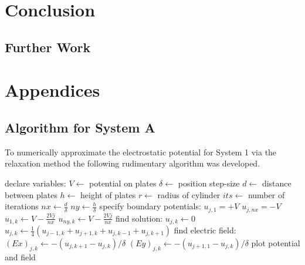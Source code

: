 \documentclass[12pt, a4paper]{article}
\begin{document}
\section{Conclusion}

\subsection{Further Work}



\appendix
\section{Appendices}
\subsection{Algorithm for System A}
To numerically approximate the electrostatic potential for System 1 via the 
relaxation method the following rudimentary algorithm was developed.

\begin{algorithm}
\begin{algorithmic}[1]
\State declare variables:
\State $V \gets$ potential on plates
\State $\delta \gets$ position step-size
\State $d \gets$ distance between plates
\State $h \gets$ height of plates
\State $r \gets$ radius of cylinder
\State $its \gets$ number of iterations
\State $nx \gets \frac{d}{\delta}$ 
\State $ny \gets \frac{h}{\delta}$ 
\State specify boundary potentials:
   \State $u_{j, 1} = +V$
   \State $u_{j, nx} = -V$
\EndFor
{}
   \State $u_{1, k} \gets V-\frac{2Vj}{nx}$
   \State $u_{ny, k} \gets V-\frac{2Vj}{nx}$
\EndFor
\State find solution:
            \State $u_{j, k} \gets 0$
         \Else
            \State $u_{j,k} \gets \frac{1}{4}(u_{j-1,k}+u_{j+1,k}+u_{j,k-1}+u_{j,k+1})$
         \EndIf
      \EndFor
   \EndFor
\EndFor
\State find electric field:
      \State $(Ex)_{j, k} \gets -\left(u_{j,k+1}-u_{j,k}\right)/\delta$
      \State $(Ey)_{j,k} \gets -\left(u_{j+1,1}-u_{j,k}\right)/\delta$
   \EndFor
\EndFor
\State plot potential and field
\EndProcedure
\end{algorithmic}
\end{algorithm}
\end{document}
